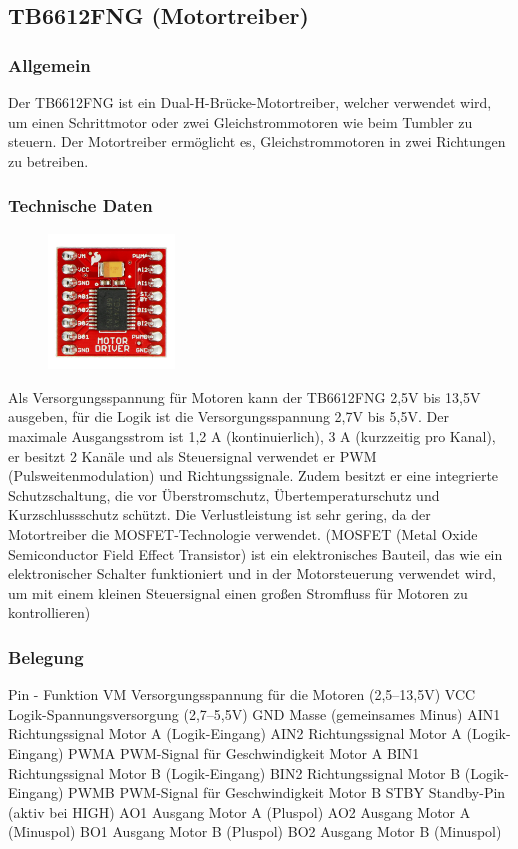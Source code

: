 \subsection{TB6612FNG (Motortreiber)}
%
\subsubsection{Allgemein}
Der TB6612FNG ist ein Dual-H-Brücke-Motortreiber, welcher verwendet wird, um einen Schrittmotor oder zwei Gleichstrommotoren wie beim Tumbler zu steuern. 
Der Motortreiber ermöglicht es, Gleichstrommotoren in zwei Richtungen zu betreiben.
\subsubsection{Technische Daten}
\begin{figure}[H]
    \includegraphics[width=0.3\textwidth, center]{img/Hardware/Motortreiber.png}
\end{figure}
Als Versorgungsspannung für Motoren kann der TB6612FNG 2,5V bis 13,5V ausgeben, für die Logik ist die Versorgungsspannung 2,7V bis 5,5V. 
Der maximale Ausgangsstrom ist 1,2 A (kontinuierlich), 3 A (kurzzeitig pro Kanal), er besitzt 2 Kanäle und als Steuersignal verwendet er PWM (Pulsweitenmodulation) und Richtungssignale. 
Zudem besitzt er eine integrierte Schutzschaltung, die vor Überstromschutz, Übertemperaturschutz und Kurzschlussschutz schützt. 
Die Verlustleistung ist sehr gering, da der Motortreiber die MOSFET-Technologie verwendet. (MOSFET (Metal Oxide Semiconductor Field Effect Transistor) ist ein elektronisches Bauteil, 
das wie ein elektronischer Schalter funktioniert und in der Motorsteuerung verwendet wird, um mit einem kleinen Steuersignal einen großen Stromfluss für Motoren zu kontrollieren)
\subsubsection{Belegung}
Pin	-	Funktion
VM	Versorgungsspannung für die Motoren (2,5–13,5V)
VCC	Logik-Spannungsversorgung (2,7–5,5V)
GND	Masse (gemeinsames Minus)
AIN1	Richtungssignal Motor A (Logik-Eingang)
AIN2	Richtungssignal Motor A (Logik-Eingang)
PWMA	PWM-Signal für Geschwindigkeit Motor A
BIN1	Richtungssignal Motor B (Logik-Eingang)
BIN2	Richtungssignal Motor B (Logik-Eingang)
PWMB	PWM-Signal für Geschwindigkeit Motor B
STBY	Standby-Pin (aktiv bei HIGH)
AO1	Ausgang Motor A (Pluspol)
AO2	Ausgang Motor A (Minuspol)
BO1	Ausgang Motor B (Pluspol)
BO2	Ausgang Motor B (Minuspol)

